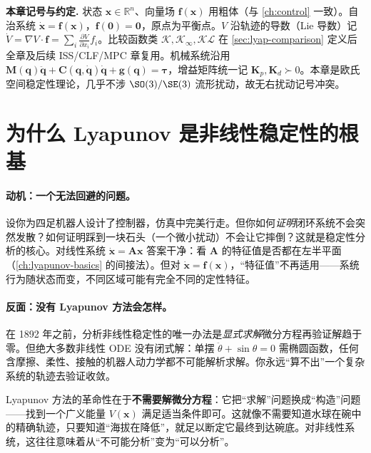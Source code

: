 \begin{note}
\textbf{本章记号与约定.}\;
状态 $\mathbf{x}\in\mathbb{R}^n$、向量场 $\mathbf{f}(\mathbf{x})$ 用粗体（与 \cref{ch:control} 一致）。自治系统 $\dot{\mathbf{x}}=\mathbf{f}(\mathbf{x})$，$\mathbf{f}(\mathbf{0})=\mathbf{0}$，原点为平衡点。$V$ 沿轨迹的导数（Lie 导数）记 $\dot V=\nabla V\cdot\mathbf{f}=\sum_i\frac{\partial V}{\partial x_i}f_i$。比较函数类 $\mathcal{K},\mathcal{K}_\infty,\mathcal{KL}$ 在 \cref{sec:lyap-comparison} 定义后全章及后续 ISS/CLF/MPC 章复用。机械系统沿用 $\mathbf{M}(\mathbf{q})\ddot{\mathbf{q}}+\mathbf{C}(\mathbf{q},\dot{\mathbf{q}})\dot{\mathbf{q}}+\mathbf{g}(\mathbf{q})=\boldsymbol{\tau}$，增益矩阵统一记 $\mathbf{K}_p,\mathbf{K}_d\succ0$。本章是欧氏空间稳定性理论，几乎不涉 $\SO(3)/\SE(3)$ 流形扰动，故无右扰动记号冲突。
\end{note}

\section{为什么 Lyapunov 是非线性稳定性的根基}
\label{sec:lyap-intro}

\paragraph{动机：一个无法回避的问题。}
设你为四足机器人设计了控制器，仿真中完美行走。但你如何\emph{证明}闭环系统不会突然发散？如何证明踩到一块石头（一个微小扰动）不会让它摔倒？这就是稳定性分析的核心。对线性系统 $\dot{\mathbf{x}}=\mathbf{A}\mathbf{x}$ 答案干净：看 $\mathbf{A}$ 的特征值是否都在左半平面（\cref{ch:lyapunov-basics} 的间接法）。但对 $\dot{\mathbf{x}}=\mathbf{f}(\mathbf{x})$，“特征值”不再适用——系统行为随状态而变，不同区域可能有完全不同的定性特征。

\paragraph{反面：没有 Lyapunov 方法会怎样。}
在 1892 年之前，分析非线性稳定性的唯一办法是\emph{显式求解}微分方程再验证解趋于零。但绝大多数非线性 ODE 没有闭式解：单摆 $\ddot\theta+\sin\theta=0$ 需椭圆函数，任何含摩擦、柔性、接触的机器人动力学都不可能解析求解。你永远“算不出”一个复杂系统的轨迹去验证收敛。

\begin{insight}
Lyapunov 方法的革命性在于\textbf{不需要解微分方程}：它把“求解”问题换成“构造”问题——找到一个广义能量 $V(\mathbf{x})$ 满足适当条件即可。这就像不需要知道水球在碗中的精确轨迹，只要知道“海拔在降低”，就足以断定它最终到达碗底。对非线性系统，这往往意味着从“不可能分析”变为“可以分析”。
\end{insight}

